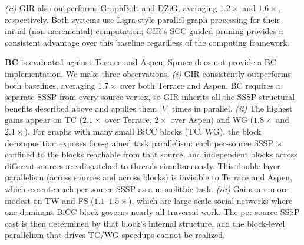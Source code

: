 \textit{(ii)} GIR also outperforms GraphBolt and DZiG, averaging $1.2\times$ and $1.6\times$, respectively.
Both systems use Ligra-style parallel graph processing for their initial (non-incremental) computation; GIR's SCC-guided pruning provides a consistent advantage over this baseline regardless of the computing framework.

\textbf{BC} is evaluated against Terrace and Aspen; Spruce does not provide a BC implementation.
We make three observations.
\textit{(i)} GIR consistently outperforms both baselines, averaging $1.7\times$ over both Terrace and Aspen.
BC requires a separate SSSP from every source vertex, so GIR inherits all the SSSP structural benefits described above and applies them $|V|$ times in parallel.
\textit{(ii)} The highest gains appear on TC ($2.1\times$ over Terrace, $2\times$ over Aspen) and WG ($1.8\times$ and $2.1\times$).
For graphs with many small BiCC blocks (TC, WG), the block decomposition exposes fine-grained task parallelism: each per-source SSSP is confined to the blocks reachable from that source, and independent blocks across different sources are dispatched to threads simultaneously.
This double-layer parallelism (across sources and across blocks) is invisible to Terrace and Aspen, which execute each per-source SSSP as a monolithic task.
\textit{(iii)} Gains are more modest on TW and FS ($1.1$--$1.5\times$), which are large-scale social networks where one dominant BiCC block governs nearly all traversal work.
The per-source SSSP cost is then determined by that block's internal structure, and the block-level parallelism that drives TC/WG speedups cannot be realized.







